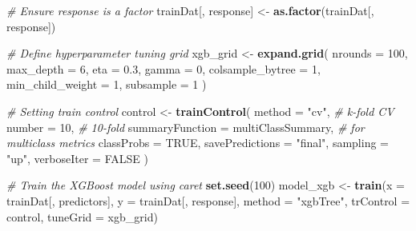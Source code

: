 \documentclass[
]{article}
\newenvironment{Shaded}{\begin{snugshade}}{\end{snugshade}}
\newcommand{\AttributeTok}[1]{\textcolor[rgb]{0.13,0.29,0.53}{#1}}
\newcommand{\CommentTok}[1]{\textcolor[rgb]{0.56,0.35,0.01}{\textit{#1}}}
\newcommand{\ConstantTok}[1]{\textcolor[rgb]{0.56,0.35,0.01}{#1}}
\newcommand{\DecValTok}[1]{\textcolor[rgb]{0.00,0.00,0.81}{#1}}
\newcommand{\FloatTok}[1]{\textcolor[rgb]{0.00,0.00,0.81}{#1}}
\newcommand{\FunctionTok}[1]{\textcolor[rgb]{0.13,0.29,0.53}{\textbf{#1}}}
\newcommand{\NormalTok}[1]{#1}
\newcommand{\OtherTok}[1]{\textcolor[rgb]{0.56,0.35,0.01}{#1}}
\newcommand{\SpecialCharTok}[1]{\textcolor[rgb]{0.81,0.36,0.00}{\textbf{#1}}}
\newcommand{\StringTok}[1]{\textcolor[rgb]{0.31,0.60,0.02}{#1}}
\begin{document}
\begin{Shaded}
\begin{Highlighting}[]
\CommentTok{\# Ensure response is a factor}
\NormalTok{trainDat[, response] }\OtherTok{\textless{}{-}} \FunctionTok{as.factor}\NormalTok{(trainDat[, response])}

\CommentTok{\# Define hyperparameter tuning grid }
\NormalTok{xgb\_grid }\OtherTok{\textless{}{-}} \FunctionTok{expand.grid}\NormalTok{(}
  \AttributeTok{nrounds =} \DecValTok{100}\NormalTok{,}
  \AttributeTok{max\_depth =} \DecValTok{6}\NormalTok{,}
  \AttributeTok{eta =} \FloatTok{0.3}\NormalTok{,}
  \AttributeTok{gamma =} \DecValTok{0}\NormalTok{,}
  \AttributeTok{colsample\_bytree =} \DecValTok{1}\NormalTok{,}
  \AttributeTok{min\_child\_weight =} \DecValTok{1}\NormalTok{,}
  \AttributeTok{subsample =} \DecValTok{1}
\NormalTok{)}

\CommentTok{\# Setting train control}
\NormalTok{control }\OtherTok{\textless{}{-}} \FunctionTok{trainControl}\NormalTok{(}
  \AttributeTok{method =} \StringTok{"cv"}\NormalTok{,         }\CommentTok{\# k{-}fold CV}
  \AttributeTok{number =} \DecValTok{10}\NormalTok{,           }\CommentTok{\# 10{-}fold}
  \AttributeTok{summaryFunction =}\NormalTok{ multiClassSummary,  }\CommentTok{\# for multiclass metrics}
  \AttributeTok{classProbs =} \ConstantTok{TRUE}\NormalTok{,}
  \AttributeTok{savePredictions =} \StringTok{"final"}\NormalTok{,}
  \AttributeTok{sampling =} \StringTok{"up"}\NormalTok{,}
  \AttributeTok{verboseIter =} \ConstantTok{FALSE}
\NormalTok{)}

\CommentTok{\# Train the XGBoost model using caret}
\FunctionTok{set.seed}\NormalTok{(}\DecValTok{100}\NormalTok{)}
\NormalTok{model\_xgb }\OtherTok{\textless{}{-}} \FunctionTok{train}\NormalTok{(}\AttributeTok{x =}\NormalTok{ trainDat[, predictors],}
                   \AttributeTok{y =}\NormalTok{ trainDat[, response],}
                   \AttributeTok{method =} \StringTok{"xgbTree"}\NormalTok{,}
                   \AttributeTok{trControl =}\NormalTok{ control,}
                   \AttributeTok{tuneGrid =}\NormalTok{ xgb\_grid)}
\end{Highlighting}
\end{Shaded}

\begin{Shaded}
\end{Shaded}
\end{document}
